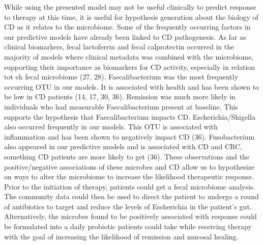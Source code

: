 \documentclass[11pt,]{article}
\begin{document}
While using the presented model may not be useful clinically to predict
response to therapy at this time, it is useful for hypothesis generation
about the biology of CD as it relates to the microbiome. Some of the
frequently occurring factors in our predictive models have already been
linked to CD pathogenesis. As far as clinical biomarkers, fecal
lactoferrin and fecal calprotectin occurred in the majority of models
where clinical metadata was combined with the microbiome, supporting
their importance as biomarkers for CD activity, especially in relation
tot eh fecal microbiome (27, 28). Faecalibacterium was the most
frequently occurring OTU in our models. It is associated with health and
has been shown to be low in CD patients (14, 17, 30, 36). Remission was
much more likely in individuals who had measurable Faecalibacterium
present at baseline. This supports the hypothesis that Faecalibacterium
impacts CD. Escherichia/Shigella also occurred frequently in our models.
This OTU is associated with inflammation and has been shown to
negatively impact CD (36). Fusobacterium also appeared in our predictive
models and is associated with CD and CRC, something CD patients are more
likely to get (36). These observations and the positive/negative
associations of these microbes and CD allow us to hypothesize on ways to
alter the microbiome to increase the likelihood therapeutic response.
Prior to the initiation of therapy, patients could get a fecal
microbiome analysis. The community data could then be used to direct the
patient to undergo a round of antibiotics to target and reduce the
levels of Escherichia in the patient's gut. Alternatively, the microbes
found to be positively associated with response could be formulated into
a daily probiotic patients could take while receiving therapy with the
goal of increasing the likelihood of remission and mucosal healing.
\end{document}

